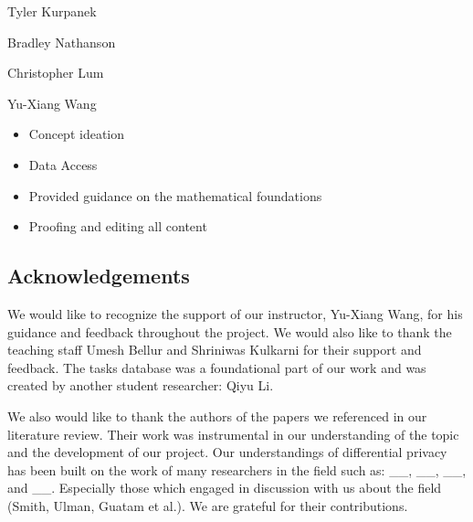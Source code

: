 \documentclass[12pt,letterpaper]{article}
\begin{document}
Tyler Kurpanek

Bradley Nathanson

Christopher Lum

Yu-Xiang Wang
\begin{itemize}
  \item Concept ideation
  \item Data Access
  \item Provided guidance on the mathematical foundations
  \item Proofing and editing all content
\end{itemize}


\subsection{Acknowledgements}

We would like to recognize the support of our instructor, Yu-Xiang Wang, for his guidance and feedback throughout the project. We would also like to thank the teaching staff Umesh Bellur and Shriniwas Kulkarni for their support and feedback. The tasks database was a foundational part of our work and was created by another student researcher: Qiyu Li. 

We also would like to thank the authors of the papers we referenced in our literature review. Their work was instrumental in our understanding of the topic and the development of our project. Our understandings of differential privacy has been built on the work of many researchers in the field such as: \_\_, \_\_, \_\_, and \_\_. Especially those which engaged in discussion with us about the field (Smith, Ulman, Guatam et al.). We are grateful for their contributions.



%

\makereference



\end{document}
